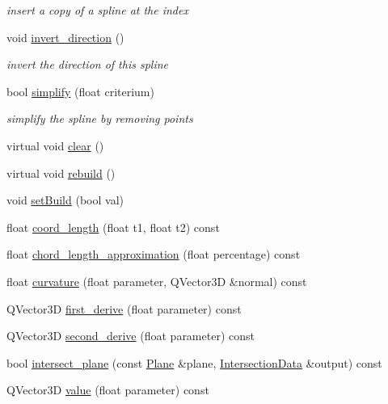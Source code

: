 \begin{DoxyCompactItemize}
\begin{DoxyCompactList}\small\item\em insert a copy of a spline at the index \end{DoxyCompactList}\item 
void \hyperlink{classShipCAD_1_1Spline_a26293a4ee636c2b968c45731425d5c94}{invert\+\_\+direction} ()
\begin{DoxyCompactList}\small\item\em invert the direction of this spline \end{DoxyCompactList}\item 
bool \hyperlink{classShipCAD_1_1Spline_a043f418b363a0dc7161b9106a72ef8b4}{simplify} (float criterium)
\begin{DoxyCompactList}\small\item\em simplify the spline by removing points \end{DoxyCompactList}\item 
virtual void \hyperlink{classShipCAD_1_1Spline_a02967f3eee8b1755eab0d7da55c3c621}{clear} ()
\item 
virtual void \hyperlink{classShipCAD_1_1Spline_a9b466ad7510032dafb0421f2d834bde6}{rebuild} ()
\item 
void \hyperlink{classShipCAD_1_1Spline_a6e932411f0f4463514f80011c58f5e6a}{set\+Build} (bool val)
\item 
float \hyperlink{classShipCAD_1_1Spline_a33226d5554ed979f264eb4c6d533145f}{coord\+\_\+length} (float t1, float t2) const 
\item 
float \hyperlink{classShipCAD_1_1Spline_a4e03c541b7c1f96c2fe8d5b1fef558c9}{chord\+\_\+length\+\_\+approximation} (float percentage) const 
\item 
float \hyperlink{classShipCAD_1_1Spline_a755e063448eccbb2714d763596630b9d}{curvature} (float parameter, Q\+Vector3D \&normal) const 
\item 
Q\+Vector3D \hyperlink{classShipCAD_1_1Spline_aff2bf1b4b2e7b5f30e5f2ca35ec93d86}{first\+\_\+derive} (float parameter) const 
\item 
Q\+Vector3D \hyperlink{classShipCAD_1_1Spline_a3c560130edff8a38ed93bf95cf759137}{second\+\_\+derive} (float parameter) const 
\item 
bool \hyperlink{classShipCAD_1_1Spline_ada8dd726a502187bf0e35022576395d3}{intersect\+\_\+plane} (const \hyperlink{classShipCAD_1_1Plane}{Plane} \&plane, \hyperlink{classShipCAD_1_1IntersectionData}{Intersection\+Data} \&output) const 
\item 
Q\+Vector3D \hyperlink{classShipCAD_1_1Spline_aa62cf7afa6461bafce7227ec31875219}{value} (float parameter) const 

\end{DoxyCompactItemize}
